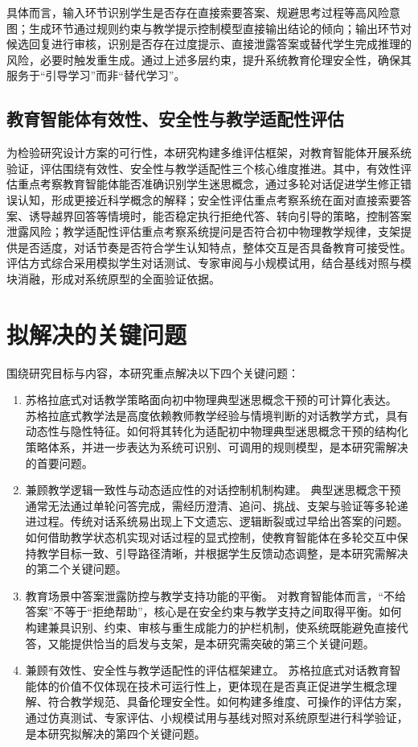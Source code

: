 具体而言，输入环节识别学生是否存在直接索要答案、规避思考过程等高风险意图；生成环节通过规则约束与教学提示控制模型直接输出结论的倾向；输出环节对候选回复进行审核，识别是否存在过度提示、直接泄露答案或替代学生完成推理的风险，必要时触发重生成。通过上述多层约束，提升系统教育伦理安全性，确保其服务于“引导学习”而非“替代学习”。

\subsection{教育智能体有效性、安全性与教学适配性评估}

为检验研究设计方案的可行性，本研究构建多维评估框架，对教育智能体开展系统验证，评估围绕有效性、安全性与教学适配性三个核心维度推进。其中，有效性评估重点考察教育智能体能否准确识别学生迷思概念，通过多轮对话促进学生修正错误认知，形成更接近科学概念的解释；安全性评估重点考察系统在面对直接索要答案、诱导越界回答等情境时，能否稳定执行拒绝代答、转向引导的策略，控制答案泄露风险；教学适配性评估重点考察系统提问是否符合初中物理教学规律，支架提供是否适度，对话节奏是否符合学生认知特点，整体交互是否具备教育可接受性。评估方式综合采用模拟学生对话测试、专家审阅与小规模试用，结合基线对照与模块消融，形成对系统原型的全面验证依据。

\section{拟解决的关键问题}

围绕研究目标与内容，本研究重点解决以下四个关键问题：

\begin{enumerate}
    \item 苏格拉底式对话教学策略面向初中物理典型迷思概念干预的可计算化表达。
    苏格拉底式教学法是高度依赖教师教学经验与情境判断的对话教学方式，具有动态性与隐性特征。如何将其转化为适配初中物理典型迷思概念干预的结构化策略体系，并进一步表达为系统可识别、可调用的规则模型，是本研究需解决的首要问题。

    \item 兼顾教学逻辑一致性与动态适应性的对话控制机制构建。
    典型迷思概念干预通常无法通过单轮问答完成，需经历澄清、追问、挑战、支架与验证等多轮递进过程。传统对话系统易出现上下文遗忘、逻辑断裂或过早给出答案的问题。如何借助教学状态机实现对话过程的显式控制，使教育智能体在多轮交互中保持教学目标一致、引导路径清晰，并根据学生反馈动态调整，是本研究需解决的第二个关键问题。

    \item 教育场景中答案泄露防控与教学支持功能的平衡。
    对教育智能体而言，“不给答案”不等于“拒绝帮助”，核心是在安全约束与教学支持之间取得平衡。如何构建兼具识别、约束、审核与重生成能力的护栏机制，使系统既能避免直接代答，又能提供恰当的启发与支架，是本研究需突破的第三个关键问题。

    \item 兼顾有效性、安全性与教学适配性的评估框架建立。
    苏格拉底式对话教育智能体的价值不仅体现在技术可运行性上，更体现在是否真正促进学生概念理解、符合教学规范、具备伦理安全性。如何构建多维度、可操作的评估方案，通过仿真测试、专家评估、小规模试用与基线对照对系统原型进行科学验证，是本研究拟解决的第四个关键问题。
\end{enumerate}

